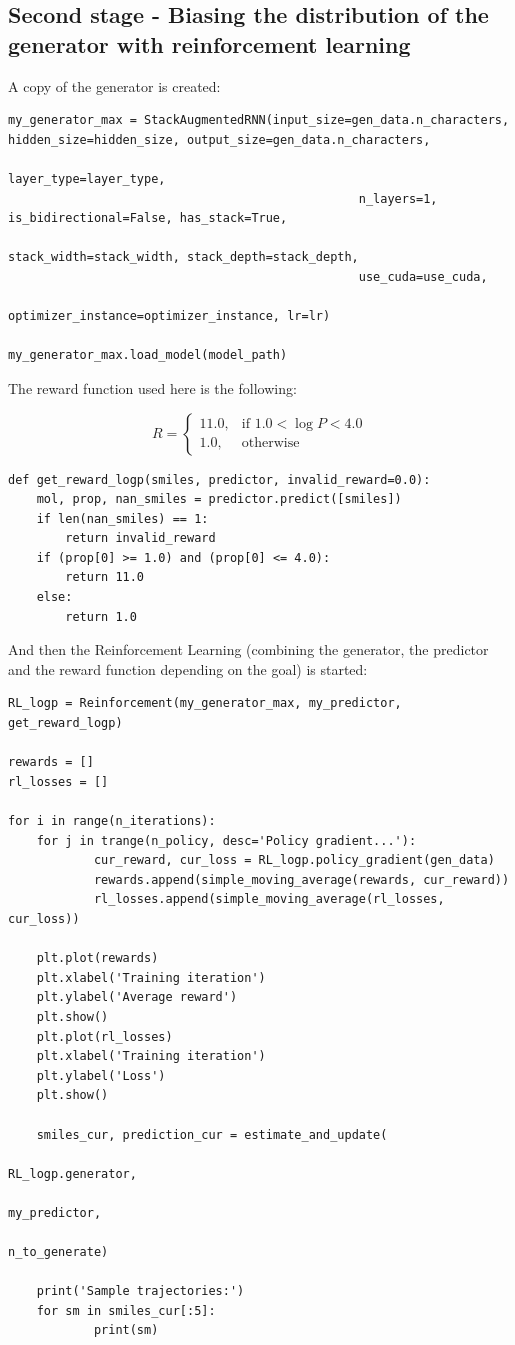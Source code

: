 \documentclass[a4paper]{article}
\begin{document}
\subsection{Second stage - Biasing the distribution of the generator with reinforcement learning}\label{sec:Second stage - Biasing the distribution of the generator with reinforcement learning}

A copy of the generator is created:

\begin{lstlisting}
my_generator_max = StackAugmentedRNN(input_size=gen_data.n_characters, hidden_size=hidden_size, output_size=gen_data.n_characters, 
												 layer_type=layer_type,
												 n_layers=1, is_bidirectional=False, has_stack=True,
												 stack_width=stack_width, stack_depth=stack_depth, 
												 use_cuda=use_cuda, 
												 optimizer_instance=optimizer_instance, lr=lr)

my_generator_max.load_model(model_path)
\end{lstlisting}

The reward function used here is the following:

$$
R =  \begin{cases} 11.0, & \mbox{if } 1.0 < \log P < 4.0 \\ 1.0, & \mbox{otherwise}  \end{cases}
$$

\begin{lstlisting}
def get_reward_logp(smiles, predictor, invalid_reward=0.0):
    mol, prop, nan_smiles = predictor.predict([smiles])
    if len(nan_smiles) == 1:
        return invalid_reward
    if (prop[0] >= 1.0) and (prop[0] <= 4.0):
        return 11.0
    else:
        return 1.0
\end{lstlisting}

And then the Reinforcement Learning (combining the generator, the predictor and the reward function depending on the goal) is started:

\begin{lstlisting}
RL_logp = Reinforcement(my_generator_max, my_predictor, get_reward_logp)

rewards = []
rl_losses = []

for i in range(n_iterations):
	for j in trange(n_policy, desc='Policy gradient...'):
			cur_reward, cur_loss = RL_logp.policy_gradient(gen_data)
			rewards.append(simple_moving_average(rewards, cur_reward)) 
			rl_losses.append(simple_moving_average(rl_losses, cur_loss))
	
	plt.plot(rewards)
	plt.xlabel('Training iteration')
	plt.ylabel('Average reward')
	plt.show()
	plt.plot(rl_losses)
	plt.xlabel('Training iteration')
	plt.ylabel('Loss')
	plt.show()
			
	smiles_cur, prediction_cur = estimate_and_update(
																				RL_logp.generator, 
																				my_predictor, 
																				n_to_generate)
																									
	print('Sample trajectories:')
	for sm in smiles_cur[:5]:
			print(sm)
\end{lstlisting}
\end{document}
